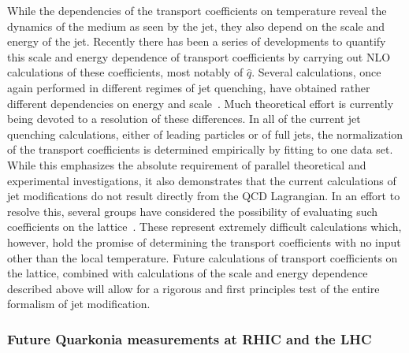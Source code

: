 While the dependencies of the transport coefficients on temperature reveal the dynamics of the medium as seen by the jet, they also depend on the scale and energy of the jet. 
Recently there has been a series of developments to quantify this scale and energy dependence of transport coefficients by carrying out NLO calculations of these coefficients, 
most notably of $\hat{q}$. Several calculations, once again performed in different regimes of jet quenching, have obtained rather different dependencies on energy and 
scale~\cite{Liou:2013qya,Kang:2013raa,Blaizot:2014bha,Iancu:2014kga}. Much theoretical effort is currently being devoted to a resolution of these differences. 
In all of the current jet quenching calculations, either of leading particles or of full jets, the normalization of the transport coefficients is determined
empirically by fitting to one data set. 
While this emphasizes the absolute requirement of parallel theoretical and experimental investigations,
it also demonstrates that the current calculations of jet modifications do not result directly from the QCD Lagrangian. In an effort to 
resolve this, several groups have considered the possibility of evaluating such coefficients 
on the lattice~\cite{Majumder:2012sh,Panero:2013pla,Ji:2013dva}. These represent 
extremely difficult calculations which, however, hold the promise of determining the transport coefficients with no input other than the local temperature. 
Future calculations of transport coefficients on the lattice, combined with calculations of the 
scale and energy dependence described above will allow for a rigorous and first principles test of the entire formalism of jet modification.



\subsubsection{Future Quarkonia measurements at RHIC and the LHC}
\label{Sec:FutureQuarkonia}

%    
%

